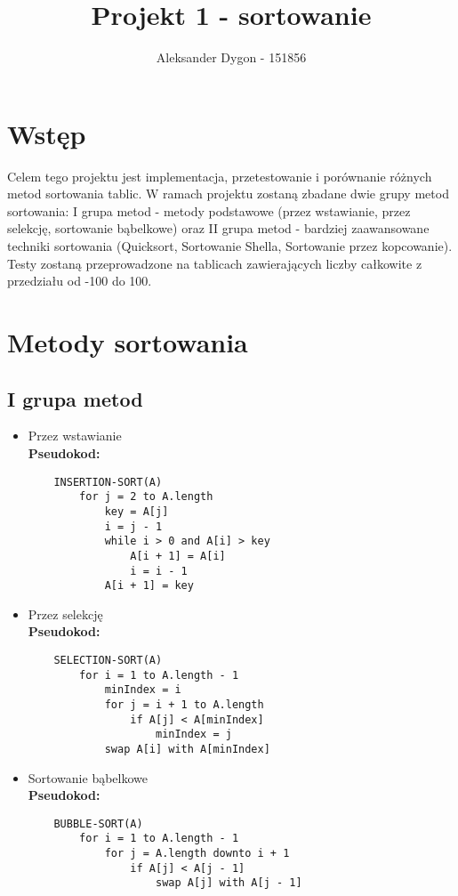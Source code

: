 \documentclass{article}
\title{Projekt 1 - sortowanie}
\author{Aleksander Dygon - 151856}
\date{}
\begin{document}
\maketitle

\section*{Wstęp}
Celem tego projektu jest implementacja, przetestowanie i porównanie różnych metod sortowania tablic. W ramach projektu zostaną zbadane dwie grupy metod sortowania: I grupa metod - metody podstawowe (przez wstawianie, przez selekcję, sortowanie bąbelkowe) oraz II grupa metod - bardziej zaawansowane techniki sortowania (Quicksort, Sortowanie Shella, Sortowanie przez kopcowanie). Testy zostaną przeprowadzone na tablicach zawierających liczby całkowite z przedziału od -100 do 100.

\section*{Metody sortowania}
\subsection*{I grupa metod}
\begin{itemize}
    \item Przez wstawianie\\
    \textbf{Pseudokod:}
    \begin{verbatim}
    INSERTION-SORT(A)
        for j = 2 to A.length
            key = A[j]
            i = j - 1
            while i > 0 and A[i] > key
                A[i + 1] = A[i]
                i = i - 1
            A[i + 1] = key
    \end{verbatim}
    
    \item Przez selekcję\\
    \textbf{Pseudokod:}
    \begin{verbatim}
    SELECTION-SORT(A)
        for i = 1 to A.length - 1
            minIndex = i
            for j = i + 1 to A.length
                if A[j] < A[minIndex]
                    minIndex = j
            swap A[i] with A[minIndex]
    \end{verbatim}
    
    \item Sortowanie bąbelkowe\\
    \textbf{Pseudokod:}
    \begin{verbatim}
    BUBBLE-SORT(A)
        for i = 1 to A.length - 1
            for j = A.length downto i + 1
                if A[j] < A[j - 1]
                    swap A[j] with A[j - 1]
    \end{verbatim}
\end{itemize}
\end{document}
